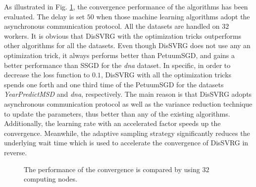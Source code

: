 \documentclass[10pt,journal,finalsubmission,compsoc]{IEEEtran}
\begin{document}
As illustrated in Fig. \ref{figure_evaluation1_convergence}, the  convergence performance of the algorithms has been evaluated. The delay is set $50$ when those machine learning algorithms adopt the asynchronous communication protocol. All the datasets are handled on $32$ workers.  It is obvious that DisSVRG with the optimization tricks outperforms other algorithms for all the datasets.  Even though DisSVRG does not use any an optimization trick, it always performs better than PetuumSGD, and gains a better performance than SSGD for the \emph{dna} dataset. In specific, in order to decrease the loss function to $0.1$, DisSVRG with all the optimization tricks spends one forth and one third time of the PetuumSGD for the datasets \emph{YearPredictMSD} and \emph{dna}, respectively.  The main reason is that DisSVRG adopts asynchronous communication protocol as well as the variance reduction technique to update the parameters, thus better than any of the existing algorithms. Additionally, the  learning rate with an accelerated factor speeds up the convergence. Meanwhile, the adaptive sampling strategy significantly reduces the underlying wait time which is used to accelerate the convergence of DisSVRG in reverse. 

\begin{figure}
\centering
{}
\caption{The performance of the convergence is compared by using $32$ computing nodes.}
\label{figure_evaluation1_convergence}
\end{figure}
\end{document}
